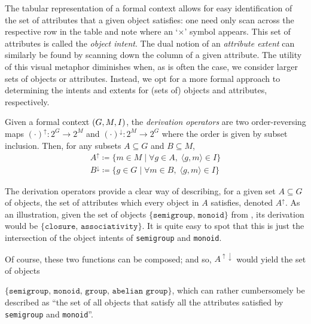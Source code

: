The tabular representation of a formal context allows for easy identification of the set of attributes that a given object satisfies: one need only scan across the respective row in the table and note where an `$\times$' symbol appears. This set of attributes is called the \textit{object intent}. The dual notion of an \textit{attribute extent} can similarly be found by scanning down the column of a given attribute. The utility of this visual metaphor diminishes when, as is often the case, we consider larger sets of objects or attributes. Instead, we opt for a more formal approach to determining the intents and extents for (sets of) objects and attributes, respectively.  

\begin{definition}
  \label{definition:derivation-operators}
  Given a formal context $(G,M,I)$, the \textit{derivation operators} are two order-reversing maps $(\cdot)^\uparrow : 2^G \to 2^M$ and $(\cdot)^\downarrow : 2^M \to 2^G$ where the order is given by subset inclusion. Then, for any subsets $A \subseteq G$ and $B \subseteq M$,
  \begin{align*}
    A^\uparrow \coloneqq \{m \in M \mid \forall g \in A, \; \langle g,m \rangle \in I\} \\
    B^\downarrow \coloneqq \{g \in G \mid \forall m \in B, \; \langle g,m \rangle \in I\}
  \end{align*}
\end{definition}

The derivation operators provide a clear way of describing, for a given set $A\subseteq G$ of objects, the set of attributes which every object in $A$ satisfies, denoted $A^\uparrow$. As an illustration, given the set of objects $\{\texttt{semigroup, monoid}\}$ from , its derivation would be $\{\texttt{closure, associativity}\}$. It is quite easy to spot that this is just the intersection of the object intents of \texttt{semigroup} and \texttt{monoid}.

Of course, these two functions can be composed; and so, $A^{\uparrow \downarrow}$ would yield the set of objects 

$\{\texttt{semigroup, monoid, group, abelian group}\}$, which can rather cumbersomely be described as ``the set of all  objects that satisfy all the attributes satisfied by \texttt{semigroup} and \texttt{monoid}''.


